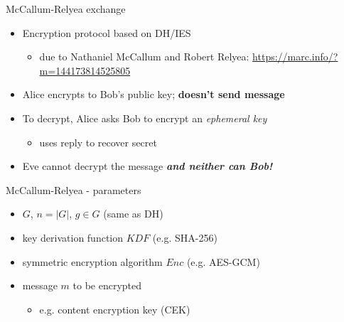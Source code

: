 \documentclass[ignorenonframetext,aspectratio=169]{beamer}
\begin{document}
\begin{frame}{McCallum-Relyea exchange}
\protect\hypertarget{mccallum-relyea-exchange}{}

\begin{itemize}
\item Encryption protocol based on DH/IES

  \begin{itemize}
  \item due to Nathaniel McCallum and Robert Relyea:
	    \url{https://marc.info/?m=144173814525805}
  \end{itemize}
\item Alice encrypts to Bob's public key; \textbf{doesn't send message}
\item To decrypt, Alice asks Bob to encrypt an \emph{ephemeral key}

  \begin{itemize}
  \item uses reply to recover secret
  \end{itemize}
\item
  Eve cannot decrypt the message \textbf{\emph{and neither can Bob!}}
\end{itemize}

\end{frame}

\begin{frame}{McCallum-Relyea - parameters}
\protect\hypertarget{mccallum-relyea-parameters}{}
\begin{itemize}
\item $G$, $n = |G|$, $g \in G$ (same as DH)
\item key derivation function $KDF$ (e.g. SHA-256)
\item symmetric encryption algorithm \(Enc\) (e.g. AES-GCM)
\item message \(m\) to be encrypted
  \begin{itemize}
  \item e.g. content encryption key (CEK)
  \end{itemize}
\end{itemize}
\end{frame}
\end{document}
